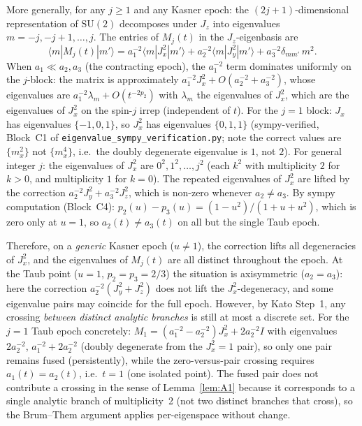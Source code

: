 \documentclass[11pt]{article}
\theoremstyle{definition}
\begin{document}
More generally, for any $j \ge 1$ and any Kasner epoch: the $(2j+1)$-dimensional
representation of $\mathrm{SU}(2)$ decomposes under $J_z$ into eigenvalues
$m = -j,-j+1,\ldots,j$.  The entries of $M_j(t)$ in the $J_z$-eigenbasis are
\[
  \langle m | M_j(t) | m' \rangle
  = a_1^{-2}\langle m|J_x^2|m'\rangle
  + a_2^{-2}\langle m|J_y^2|m'\rangle
  + a_3^{-2}\delta_{mm'}\,m^2.
\]
When $a_1 \ll a_2, a_3$ (the contracting epoch), the $a_1^{-2}$ term dominates
uniformly on the $j$-block: the matrix is approximately
$a_1^{-2}J_x^2 + O(a_2^{-2}+a_3^{-2})$, whose eigenvalues are
$a_1^{-2}\lambda_m + O(t^{-2p_2})$ with $\lambda_m$ the eigenvalues of $J_x^2$,
which are the eigenvalues of $J_x^2$ on the spin-$j$ irrep (independent of $t$).
For the $j=1$ block: $J_x$ has eigenvalues $\{-1,0,1\}$, so $J_x^2$ has
eigenvalues $\{0,1,1\}$ (sympy-verified, Block~C1 of
\texttt{eigenvalue\_sympy\_verification.py}; note the correct values are
$\{m_x^2\}$ not $\{m_x^4\}$, i.e.\ the doubly degenerate eigenvalue is $1$, not $2$).
For general integer $j$: the eigenvalues of $J_x^2$ are $0^2, 1^2, \ldots, j^2$
(each $k^2$ with multiplicity $2$ for $k>0$, and multiplicity $1$ for $k=0$).
The repeated eigenvalues of $J_x^2$ are lifted by the correction
$a_2^{-2}J_y^2 + a_3^{-2}J_z^2$, which is non-zero whenever $a_2 \neq a_3$.
By sympy computation (Block~C4): $p_2(u)-p_3(u) = (1-u^2)/(1+u+u^2)$, which is
zero only at $u=1$, so $a_2(t)\neq a_3(t)$ on all but the single Taub epoch.

Therefore, on a \emph{generic} Kasner epoch ($u\neq 1$), the correction lifts all
degeneracies of $J_x^2$, and the eigenvalues of $M_j(t)$ are all distinct throughout
the epoch.  At the Taub point ($u=1$, $p_2=p_3=2/3$) the situation is axisymmetric
($a_2=a_3$): here the correction $a_2^{-2}(J_y^2+J_z^2)$ does not lift the
$J_x^2$-degeneracy, and some eigenvalue pairs may coincide for the full epoch.
However, by Kato Step~1, any crossing \emph{between distinct analytic branches}
is still at most a discrete set.  For the $j=1$ Taub epoch concretely:
$M_1 = (a_1^{-2}-a_2^{-2})J_x^2 + 2a_2^{-2}I$ with eigenvalues
$2a_2^{-2}$, $a_1^{-2}+2a_2^{-2}$ (doubly degenerate from the $J_x^2=1$ pair),
so only one pair remains fused (persistently), while the zero-versus-pair crossing
requires $a_1(t)=a_2(t)$, i.e.\ $t=1$ (one isolated point).  The fused pair
does not contribute a crossing in the sense of Lemma~\ref{lem:A1} because it
corresponds to a single analytic branch of multiplicity~2 (not two distinct branches
that cross), so the Brum--Them argument applies per-eigenspace without change.
\end{document}
